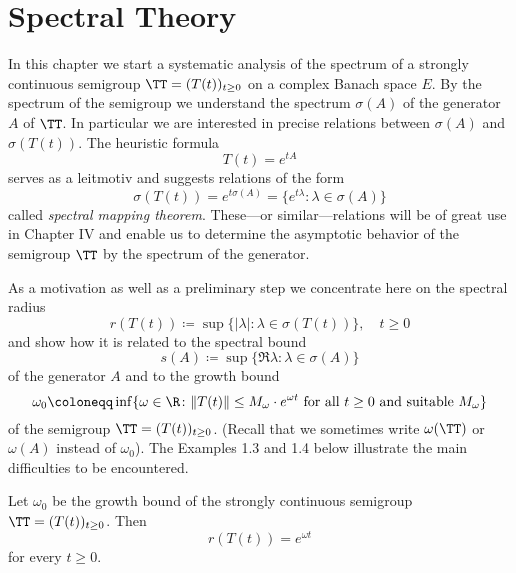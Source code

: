 \setcounter{chapter}{2}
\author{Günther Greiner and Rainer Nagel}
\chapter{Spectral Theory}\label{chap:A-III}


In this chapter we start a systematic analysis of the spectrum of a strongly continuous semigroup $\TT = (T(t))_{t\geq 0}$ on a complex Banach space $E$.
By the spectrum of the semigroup we understand the spectrum $\sigma(A)$ of the generator $A$ of $\TT$.
In particular we are interested in precise relations between $\sigma(A)$ and $\sigma(T(t))$.
The heuristic formula
\[
T(t) = e^{tA}
\]
serves as a leitmotiv and suggests relations of the form
\[
\sigma(T(t)) = e^{t\sigma(A)} = \{ e^{t\lambda} \colon \lambda \in \sigma(A) \}
\]
called \emph{spectral mapping theorem}.
These---or similar---relations will be of great use in Chapter IV and enable us to determine the asymptotic behavior of the semigroup $\TT$ by the spectrum of the generator.

As a motivation as well as a preliminary step we concentrate here on the spectral radius
\[
r(T(t)) \coloneqq \sup \{ |\lambda| \colon \lambda \in \sigma(T(t)) \}, \quad t \geq 0
\]
and show how it is related to the spectral bound
\[
s(A) \coloneqq \sup \{ \Re\lambda \colon \lambda \in \sigma(A) \}
\]
of the generator $A$ and to the growth bound
\[
\omega_{0} \coloneqq \inf \{\omega \in \R \colon \|T(t)\| \leq M_{\omega}\cdot e^{\omega t} \text{ for all } t \geq 0 \text{ and suitable } M_{\omega}\}
\]
of the semigroup $\TT = (T(t))_{t\geq 0}$.
(Recall that we sometimes write $\omega(\TT)$ or $\omega(A)$ instead of $\omega_{0}$).
The Examples 1.3 and 1.4 below illustrate the main difficulties to be encountered.
\begin{proposition}\label{prop:1.1}
Let $\omega_{0}$ be the growth bound of the strongly continuous semigroup $\TT = (T(t))_{t\geq 0}$.
Then
\[
r(T(t)) = e^{\omega t}
\]
for every $t \geq 0$.
\end{proposition}

\newpage


